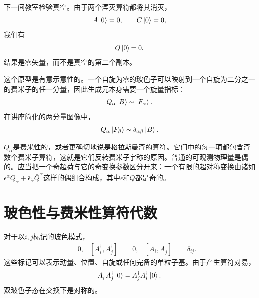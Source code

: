 下一间教室检验真空。由于两个湮灭算符都将其消灭，
\begin{equation}
A\left\lvert0\right\rangle=0,\qquad C\left\lvert0\right\rangle=0,
\end{equation}
我们有
\begin{equation}
Q\left\lvert0\right\rangle=0.
\end{equation}
结果是零矢量，而不是真空的第二个副本。

这个原型是有意示意性的。一个自旋为零的玻色子可以映射到一个自旋为二分之一的费米子的任一分量，因此生成元本身需要一个旋量指标：
\begin{equation}
Q_\alpha\left\lvert B\right\rangle\sim\left\lvert F_\alpha\right\rangle.
\end{equation}
在讲座简化的两分量图像中，
\begin{equation}
Q_\alpha\left\lvert F_\beta\right\rangle\sim\delta_{\alpha\beta}\left\lvert B\right\rangle.
\end{equation}

\begin{classroomqa}
\end{classroomqa}

\(Q_\alpha\)是费米性的，或者更确切地说是格拉斯曼奇的算符。它们中的每一项都包含奇数个费米子算符，这就是它们反转费米子宇称的原因。普通的可观测物理量是偶的。应当把一个奇超荷与它的奇变换参数区分开来：一个有限的超对称变换由诸如\(\epsilon^\alpha Q_\alpha+\bar\epsilon_{\dot\alpha}\bar Q^{\dot\alpha}\)这样的偶组合构成，其中\(\epsilon\)和\(Q\)都是奇的。

\section{玻色性与费米性算符代数}

对于以\(i,j\)标记的玻色模式，
\begin{align}
[A_i,A_j]&=0,&
[A_i^\dagger,A_j^\dagger]&=0,&
[A_i,A_j^\dagger]&=\delta_{ij}.
\end{align}
这些标记可以表示动量、位置、自旋或任何完备的单粒子基。由于产生算符对易，
\begin{equation}
A_i^\dagger A_j^\dagger\left\lvert0\right\rangle
=A_j^\dagger A_i^\dagger\left\lvert0\right\rangle.
\end{equation}
双玻色子态在交换下是对称的。

